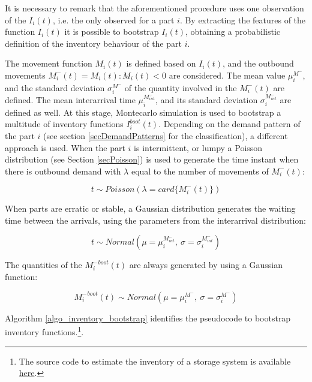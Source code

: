 It is necessary to remark that the aforementioned procedure uses one observation of the $I_i(t)$, i.e. the only observed for a part $i$. By extracting the features of the function $I_i(t)$ it is possible to bootstrap $I_i\left(t\right)$, obtaining a probabilistic definition of the inventory behaviour of the part $i$.\par

The movement function $M_i(t)$ is defined based on $I_i(t)$, and the outbound movements $M_i^-\left(t\right)=M_i\left(t\right):M_i\left(t\right)<0$ are considered. The mean value $\mu_i^{M^-}$, and the standard deviation $\sigma_i^{M^-}$ of the quantity involved in the $M_i^-(t)$ are defined. The mean interarrival time $\mu_i^{M_{int}^-}$, and its standard deviation $\sigma_i^{M_{int}^-}$ are defined as well. At this stage, Montecarlo simulation is used to bootstrap a multitude of inventory functions $I_i^{boot}(t)$. Depending on the demand pattern of the part $i$ (see section \ref{secDemandPatterns} for the classification), a different approach is used. When the part $i$ is intermittent, or lumpy a Poisson distribution (see Section \ref{secPoisson}) is used to generate the time instant when there is outbound demand  with $\lambda$ equal to the number of movements of $M_i^-\left(t\right)$:

\begin{equation}
    t \sim Poisson(\lambda = card\{M_i^-\left(t\right)\})
\end{equation}

When parts are erratic or stable, a Gaussian distribution generates the waiting time between the arrivals, using the parameters from the interarrival distribution:

\begin{equation}
    t \sim Normal (\mu=\mu_i^{M_{int}^-},\ \sigma=\sigma_i^{M_{int}^-})
\end{equation}

The quantities of the ${M_i^-}^{boot}\left(t\right)$ are always generated by using a Gaussian function:

\begin{equation}
    {M_i^-}^{boot}\left(t\right) \sim Normal(\mu=\mu_i^{M^-},\ \sigma=\sigma_i^{M^-})
\end{equation}

Algorithm \ref{algo_inventory_bootstrap} identifies the pseudocode  to bootstrap inventory functions.\footnote{The source code to estimate the inventory of a storage system is available \href{https://github.com/aletuf93/logproj/blob/master/logproj/information_framework.py}{here}.}.

